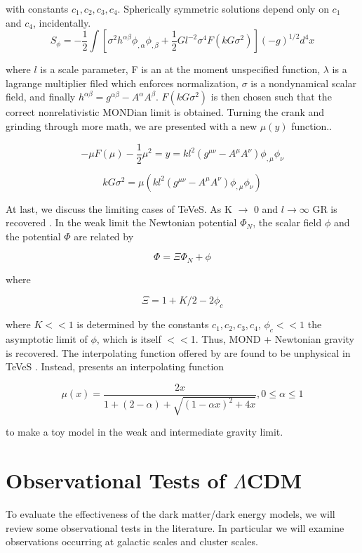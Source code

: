 \documentclass[12pt]{article}
\begin{document}
with constants $c_{1}, c_{2}, c_{3}, c_{4}$. Spherically symmetric solutions depend only on $c_{1}$ and $ c_{4}$, incidentally. 
$$ S_{\phi} = -\frac{1}{2} \int [\sigma^{2}h^{\alpha \beta} \phi_{,\alpha} \phi_{,\beta} + \frac{1}{2} Gl^{-2} \sigma^{4}F(kG\sigma^{2})] (-g)^{1/2} d^{4}x$$

where $l$ is a scale parameter, F is an at the moment unspecified function, $\lambda$ is a lagrange multiplier filed which enforces normalization, $\sigma$ is a nondynamical scalar field, and finally $h^{\alpha \beta} = g^{\alpha \beta} - A^{\alpha} A^{\beta}$.  $F(kG\sigma^{2})$ is then chosen such that the correct nonrelativistic MONDian limit is obtained. Turning the crank and grinding through more math, we are presented with a new $\mu(y)$ function.\cite{Bekenstein2004}.

$$ -\mu F(\mu) -\frac{1}{2}\mu^{2} = y = kl^{2}(g^{\mu \nu} - A^{\mu}A^{\nu})\phi_{,\mu} \phi_{\nu}$$

$$ kG\sigma^{2} = \mu(kl^{2}(g^{\mu \nu} - A^{\mu}A^{\nu})\phi_{,\mu} \phi_{\nu})$$

At last, we discuss the limiting cases of TeVeS. As K $\rightarrow$ 0 and $l \rightarrow \infty$ GR is recovered \cite{Bekenstein2004}. In the weak limit the Newtonian potential $\Phi_{N}$, the scalar field $\phi$ and the potential $\Phi$ are related by 

$$\Phi = \Xi \Phi_{N} + \phi$$

where

$$\Xi = 1 + K/2 - 2\phi_{c} $$

where $K << 1$ is determined by the constants $c_{1}, c_{2}, c_{3}, c_{4}$, $\phi_{c} << 1$ the asymptotic limit of $\phi$, which is itself $<<$1. Thus, MOND + Newtonian gravity is recovered. The interpolating function offered by \cite{MilgromI1983} are found to be unphysical in TeVeS \cite{Angus2006}. Instead, \cite{Bekenstein2004} presents an interpolating function

$$ \mu(x) = \frac{2x}{1 + (2 - \alpha) + \sqrt{(1 - \alpha x)^{2} + 4x}}, 0 \leq \alpha \leq 1 $$

to make a toy model in the weak and intermediate gravity limit.

\section{Observational Tests of $\Lambda$CDM}
To evaluate the effectiveness of the dark matter/dark energy models, we will review some observational tests in the literature. In particular we will examine observations occurring at galactic scales and cluster scales. 
\end{document}
